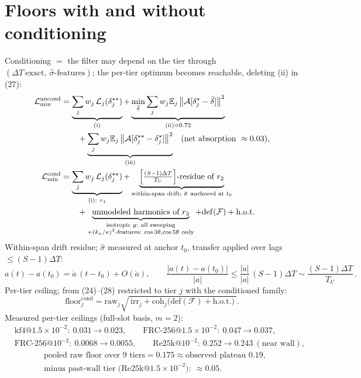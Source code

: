 \documentclass[11pt]{article}
\newcommand{\DT}{\Delta T}
\newcommand{\norm}[1]{\left\lVert #1 \right\rVert}
\newcommand{\E}{\mathbb{E}}
\begin{document}
\section{Floors with and without conditioning}

Conditioning $=$ the filter may depend on the tier through
$(\DT\ \text{exact},\ \hat\sigma\text{-features})$; the per-tier optimum
becomes reachable, deleting (ii) in (27):
\begin{align}
\mathcal{L}_{\min}^{\mathrm{uncond}}
&=\underbrace{\sum_j w_j\,\mathcal{L}_j(\delta^{\star\star}_j)}_{\text{(i)}}
+\underbrace{\min_{\bar\delta}\sum_j w_j\E_j
\norm{\mathcal{A}[\delta^\star_j-\bar\delta]}^{2}}_{\text{(ii)}=0.72}\notag\\
&\qquad
+\underbrace{\sum_j w_j\E_j\norm{\mathcal{A}
[\delta^{\star\star}_j-\delta^\star_j]}^{2}}_{\text{(iii)}}
\quad(\text{net absorption }\approx0.03),\\
\mathcal{L}_{\min}^{\mathrm{cond}}
&=\underbrace{\sum_j w_j\,\mathcal{L}_j(\delta^{\star\star}_j)}
_{\text{(i): }r_1}
+\underbrace{\Bigl[\tfrac{(S-1)\DT}{T_U}\Bigr]\text{-residue of }r_2}
_{\text{within-span drift; }\hat\sigma\ \text{anchored at }t_0}\notag\\
&\qquad
+\underbrace{\text{unmodeled harmonics of }r_3}
_{\substack{\text{isotropic }g:\ \text{all sweeping}\\
+(k_x/\kappa)^{2}\text{-features}:\ \cos3\theta,\cos5\theta\ \text{only}}}
+\mathrm{def}(\mathcal{F})+\text{h.o.t.}
\end{align}
Within-span drift residue; $\hat\sigma$ measured at anchor $t_0$, transfer
applied over lags $\le(S-1)\DT$:
\begin{equation}
a(t)-a(t_0)=\dot a\,(t-t_0)+O(\ddot a),\qquad
\frac{|a(t)-a(t_0)|}{|a|}
\le\frac{|\dot a|}{|a|}\,(S-1)\DT
\sim\frac{(S-1)\DT}{T_U}\,.
\end{equation}
Per-tier ceiling; from (24)--(28) restricted to tier $j$ with the conditioned
family:
\begin{equation}
\mathrm{floor}_j^{\mathrm{cond}}
=\mathrm{raw}_j\sqrt{\ \mathrm{irr}_j
+\mathrm{coh}_j\bigl(\mathrm{def}(\mathcal{F})+\text{h.o.t.}\bigr)\ }.
\end{equation}
Measured per-tier ceilings (full-slot basis, $m=2$):
\begin{equation}
\begin{aligned}
&\text{kf4}@1.5\!\times\!10^{-2}:\ 0.031\to0.023,\qquad
\text{FRC-256}@1.5\!\times\!10^{-2}:\ 0.047\to0.037,\\
&\text{FRC-256}@10^{-2}:\ 0.0068\to0.0055,\qquad
\text{Re25k}@10^{-2}:\ 0.252\to0.243\ (\text{near wall}),
\end{aligned}
\end{equation}
\begin{equation}
\begin{aligned}
&\text{pooled raw floor over 9 tiers}=0.175\approx\text{observed plateau }0.19,\\
&\text{minus past-wall tier (Re25k}@1.5\!\times\!10^{-2}):\ \approx0.05 .
\end{aligned}
\end{equation}
\end{document}
